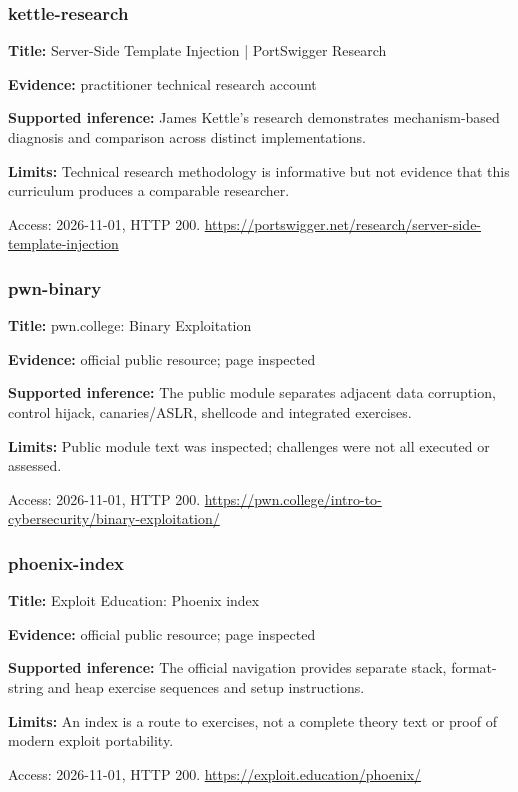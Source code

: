 \subsubsection{kettle-research}
\noindent\textbf{Title:} Server-Side Template Injection | PortSwigger Research\par
\noindent\textbf{Evidence:} practitioner technical research account\par
\noindent\textbf{Supported inference:} James Kettle’s research demonstrates mechanism-based diagnosis and comparison across distinct implementations.\par
\noindent\textbf{Limits:} Technical research methodology is informative but not evidence that this curriculum produces a comparable researcher.\par
\noindent Access: 2026-11-01, HTTP 200. \url{https://portswigger.net/research/server-side-template-injection}
\subsubsection{pwn-binary}
\noindent\textbf{Title:} pwn.college: Binary Exploitation\par
\noindent\textbf{Evidence:} official public resource; page inspected\par
\noindent\textbf{Supported inference:} The public module separates adjacent data corruption, control hijack, canaries/ASLR, shellcode and integrated exercises.\par
\noindent\textbf{Limits:} Public module text was inspected; challenges were not all executed or assessed.\par
\noindent Access: 2026-11-01, HTTP 200. \url{https://pwn.college/intro-to-cybersecurity/binary-exploitation/}
\subsubsection{phoenix-index}
\noindent\textbf{Title:} Exploit Education: Phoenix index\par
\noindent\textbf{Evidence:} official public resource; page inspected\par
\noindent\textbf{Supported inference:} The official navigation provides separate stack, format-string and heap exercise sequences and setup instructions.\par
\noindent\textbf{Limits:} An index is a route to exercises, not a complete theory text or proof of modern exploit portability.\par
\noindent Access: 2026-11-01, HTTP 200. \url{https://exploit.education/phoenix/}
